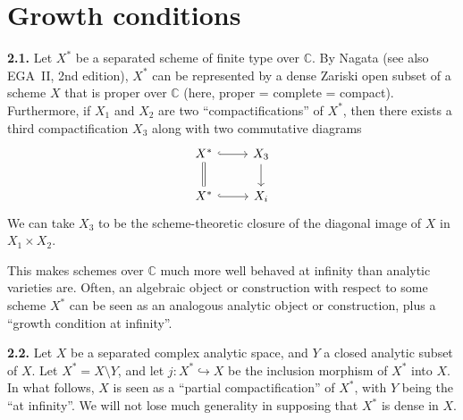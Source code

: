 \documentclass{report}
\newenvironment{rmenv}[1]
  {\phantomsection\par\medskip\noindent\textbf{#1.}\rmfamily}
  {\medskip}
\newcommand{\CC}{\mathbb{C}}
\newcommand{\oldpage}[1]{\marginpar{\footnotesize$\Big\vert$ \textit{p.~#1}}}
\begin{document}


\section{Growth conditions}
\label{II.2}

\begin{rmenv}{2.1}
\label{II.2.1}
  Let $X^*$ be a separated scheme of finite type over $\CC$.
  By Nagata \cite{20} (see also EGA~II, 2nd edition), $X^*$ can be represented by a dense Zariski open subset of a scheme $X$ that is proper over $\CC$ (here, proper = complete = compact).
  Furthermore, if $X_1$ and $X_2$ are two ``compactifications'' of $X^*$, then there exists a third compactification $X_3$ along with two commutative diagrams
  \[
    \begin{tikzcd}
      X^* \rar[hook] \dar[equal]
      & X_3 \dar
    \\ X^* \rar[hook]
      & X_i
    \end{tikzcd}
  \]
  We can take $X_3$ to be the scheme-theoretic closure of the diagonal image of $X$ in $X_1\times X_2$.

  This makes schemes over $\CC$ much more well behaved at infinity than analytic varieties are.
  Often, an algebraic object or construction with respect to some scheme $X^*$ can be seen as an analogous analytic object or construction, plus a ``growth condition at infinity''.
\end{rmenv}

\oldpage{61}
\begin{rmenv}{2.2}
\label{II.2.2}
  Let $X$ be a separated complex analytic space, and $Y$ a closed analytic subset of $X$.
  Let $X^*=X\setminus Y$, and let $j\colon X^*\hookrightarrow X$ be the inclusion morphism of $X^*$ into $X$.
  In what follows, $X$ is seen as a ``partial compactification'' of $X^*$, with $Y$ being the ``at infinity''.
  We will not lose much generality in supposing that $X^*$ is dense in $X$.
\end{rmenv}
\end{document}
